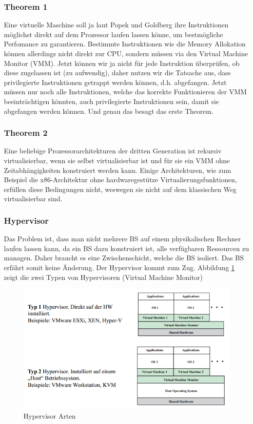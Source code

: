 \subsubsection{Theorem 1}
\label{sec:poppek-goldberg-theorem1}
Eine virtuelle Maschine soll ja laut Popek und Goldberg ihre Instruktionen möglichst direkt auf dem Prozessor laufen lassen könne, um bestmögliche Perfomance zu garantieren. Bestimmte Instruktionen wie die Memory Allokation können allerdings nicht direkt zur CPU, sondern müssen via den Virtual Machine Monitor (VMM). Jetzt können wir ja nicht für jede Instruktion überprüfen, ob diese zugelassen ist (zu aufwendig), daher nutzen wir die Tatsache aus, dass privilegierte Instruktionen getrappt werden können, d.h. abgefangen. Jetzt müssen nur noch alle Instruktionen, welche das korrekte Funktionieren der VMM beeinträchtigen könnten, auch privilegierte Instruktionen sein, damit sie abgefangen werden können. Und genau das besagt das erste Theorem.

\subsubsection{Theorem 2}
Eine beliebige Prozessorarchitekturen der dritten Generation ist rekursiv virtualisierbar, wenn sie selbst virtualisierbar ist und für sie ein VMM ohne Zeitabhängigkeiten konstruiert werden kann.
Einige Architekturen, wie zum Beispiel die x86-Architektur ohne hardwaregestütze Virtualierungsfunktionen, erfüllen diese Bedingungen nicht, weswegen sie nicht auf dem klassischen Weg virtualisierbar sind.

\subsubsection{Hypervisor}
Das Problem ist, dass man nicht mehrere BS auf einem physikalischen Rechner laufen lassen kann, da ein BS dazu konstruiert ist, alle verfügbaren Ressourcen zu managen. Daher braucht es eine Zwischenschicht, welche die BS isoliert. Das BS erfährt somit keine Änderung. Der Hypervisor kommt zum Zug. Abbildung \ref{fig:hypervisor-types} zeigt die zwei Typen von Hypervisoren (Virtual Machine Monitor)

\begin{figure}[h!]
\centering
\includegraphics[width=0.8\linewidth]{fig/hypervisor-types}
\caption{Hypervisor Arten}
\label{fig:hypervisor-types}
\end{figure}

